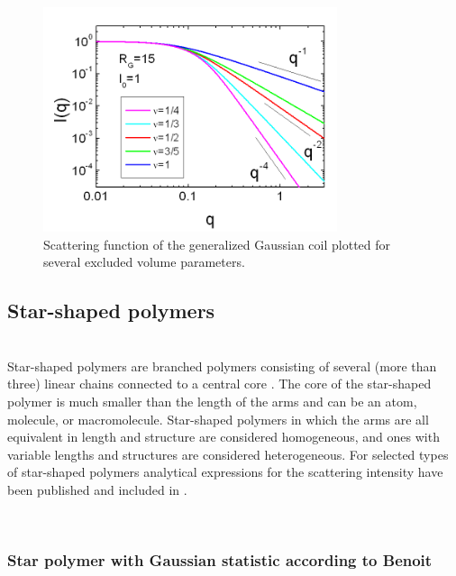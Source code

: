 \begin{figure}[htb]
\begin{center}
\includegraphics[width=0.768\textwidth,height=0.588\textwidth]{generalized_gaussian_coils.png}
\end{center}
\caption{Scattering function of the generalized Gaussian coil plotted for several excluded volume parameters.}
\label{fig:I_generalized_gaussian_coils}
\end{figure}

\clearpage
\subsection{Star-shaped polymers}
\label{sect:StarShapedPolymers}
~\\
Star-shaped polymers \cite{Wikipedia2018StarShapedPolymers} are branched polymers consisting of several (more than three) linear chains connected to a central core \cite{Ren2016}. The core of the star-shaped polymer is much smaller than the length of the arms and can be an atom, molecule, or macromolecule. Star-shaped polymers in which the arms are all equivalent in length and structure are considered homogeneous, and ones with variable lengths and structures are considered heterogeneous. For selected types of star-shaped polymers analytical expressions for the scattering intensity have been published and included in \SASfit.

~\\
\subsubsection{Star polymer with Gaussian statistic according to Benoit}
\label{sect:Benoit}
~\\


